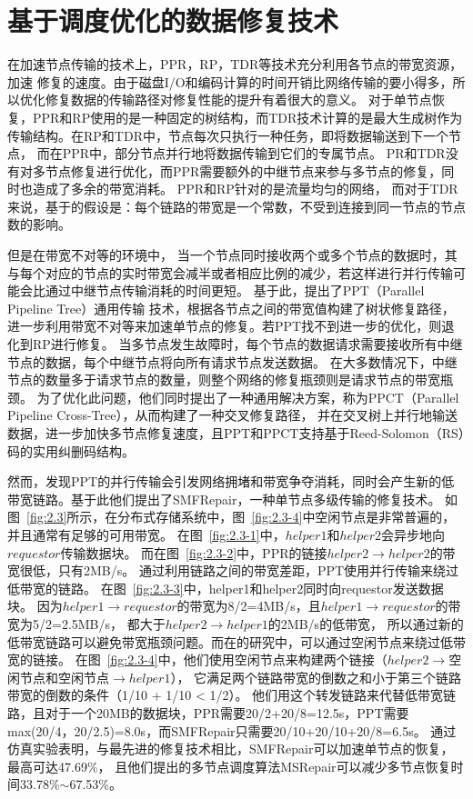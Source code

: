 \section{基于调度优化的数据修复技术}

在加速节点传输的技术上，PPR\cite{mitra2016partial}，RP\cite{li2017repair}，TDR\cite{li2009tree}等技术充分利用各节点的带宽资源，加速
修复的速度。由于磁盘I/O和编码计算的时间开销比网络传输的要小得多\cite{li2017repair,mitra2016partial}，所以优化修复数据的传输路径对修复性能的提升有着很大的意义。
对于单节点恢复，PPR和RP使用的是一种固定的树结构，而TDR技术计算的是最大生成树作为传输结构。在RP和TDR中，节点每次只执行一种任务，即将数据输送到下一个节点，
而在PPR中，部分节点并行地将数据传输到它们的专属节点。
PR和TDR没有对多节点修复进行优化，而PPR需要额外的中继节点来参与多节点的修复，同时也造成了多余的带宽消耗。
PPR和RP针对的是流量均匀的网络，
而对于TDR来说，基于的假设是：每个链路的带宽是一个常数，不受到连接到同一节点的节点数的影响。

但是在带宽不对等的环境中，
当一个节点同时接收两个或多个节点的数据时，其与每个对应的节点的实时带宽会减半或者相应比例的减少，若这样进行并行传输可能会比通过中继节点传输消耗的时间更短。
基于此，\citet{bai2019fast}提出了PPT（Parallel Pipeline Tree）通用传输
技术，根据各节点之间的带宽值构建了树状修复路径，进一步利用带宽不对等来加速单节点的修复。若PPT找不到进一步的优化，则退化到RP进行修复。
当多节点发生故障时，每个节点的数据请求需要接收所有中继节点的数据，每个中继节点将向所有请求节点发送数据。
在大多数情况下，中继节点的数量多于请求节点的数量，则整个网络的修复瓶颈则是请求节点的带宽瓶颈。
为了优化此问题，他们同时提出了一种通用解决方案，称为PPCT（Parallel Pipeline Cross-Tree），从而构建了一种交叉修复路径，
并在交叉树上并行地输送数据，进一步加快多节点修复速度，且PPT和PPCT支持基于Reed-Solomon（RS）码的实用纠删码结构。

然而，\citet{zhou2022bandwidth}发现PPT的并行传输会引发网络拥堵和带宽争夺消耗，同时会产生新的低带宽链路。基于此他们提出了SMFRepair，一种单节点多级传输的修复技术。
如图~\ref{fig:2.3}所示，在分布式存储系统中，图~\ref{fig:2.3-4}中空闲节点是非常普遍的，并且通常有足够的可用带宽。
在图~\ref{fig:2.3-1}中，$helper1$和$helper2$会异步地向$requestor$传输数据块。
而在图~\ref{fig:2.3-2}中，PPR的链接$helper2 \rightarrow helper2$的带宽很低，只有2MB/s。
通过利用链路之间的带宽差距，PPT使用并行传输来绕过低带宽的链路。
在图~\ref{fig:2.3-3}中，helper1和helper2同时向requestor发送数据块。
因为$helper1 \rightarrow requestor$的带宽为8/2=4MB/s，且$helper1 \rightarrow requestor$的带宽为5/2=2.5MB/s，
都大于$helper2 \rightarrow helper1$的2MB/s的低带宽，
所以通过新的低带宽链路可以避免带宽瓶颈问题。而在\citet{zhou2022bandwidth}的研究中，可以通过空闲节点来绕过低带宽的链接。
在图~\ref{fig:2.3-4}中，他们使用空闲节点来构建两个链接（$helper2 \rightarrow $空闲节点和空闲节点$\rightarrow helper1$），
它满足两个链路带宽的倒数之和小于第三个链路带宽的倒数的条件（1/10 + 1/10 < 1/2）。
他们用这个转发链路来代替低带宽链路，且对于一个20MB的数据块，PPR需要20/2+20/8=12.5s，PPT需要max(20/4，20/2.5)=8.0s，而SMFRepair只需要20/10+20/10+20/8=6.5s。
通过仿真实验表明，与最先进的修复技术相比，SMFRepair可以加速单节点的恢复，最高可达47.69\%，
且他们提出的多节点调度算法MSRepair可以减少多节点恢复时间33.78\%$\sim$67.53\%。

